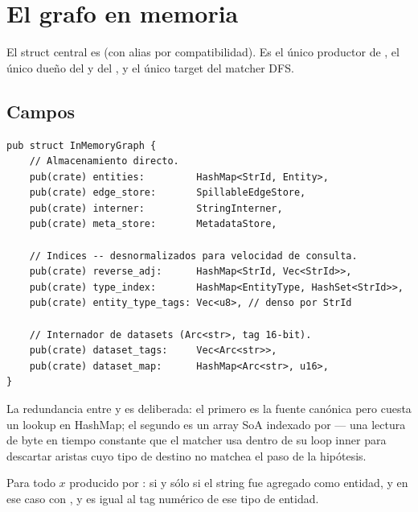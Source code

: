 \chapter{El grafo en memoria}
\label{ch:graph-hunter}

El struct central es \Graph{} (con alias  por
compatibilidad). Es el único productor de ,
el único dueño del  y del
, y el único target del matcher DFS.

\section{Campos}

\begin{lstlisting}[style=rust]
pub struct InMemoryGraph {
    // Almacenamiento directo.
    pub(crate) entities:         HashMap<StrId, Entity>,
    pub(crate) edge_store:       SpillableEdgeStore,
    pub(crate) interner:         StringInterner,
    pub(crate) meta_store:       MetadataStore,

    // Indices -- desnormalizados para velocidad de consulta.
    pub(crate) reverse_adj:      HashMap<StrId, Vec<StrId>>,
    pub(crate) type_index:       HashMap<EntityType, HashSet<StrId>>,
    pub(crate) entity_type_tags: Vec<u8>, // denso por StrId

    // Internador de datasets (Arc<str>, tag 16-bit).
    pub(crate) dataset_tags:     Vec<Arc<str>>,
    pub(crate) dataset_map:      HashMap<Arc<str>, u16>,
}
\end{lstlisting}

La redundancia entre  y
 es deliberada: el primero es la
fuente canónica pero cuesta un lookup en HashMap; el segundo es
un array SoA indexado por  --- una lectura
de byte en tiempo constante que el matcher usa dentro de su loop
inner para descartar aristas cuyo tipo de destino no matchea el
paso de la hipótesis.

\begin{invariant}
Para todo \StrId{} $x$ producido por :
 si y sólo si el string fue
agregado como entidad, y en ese caso
 con , y
 es igual al tag numérico
de ese tipo de entidad.
\end{invariant}

